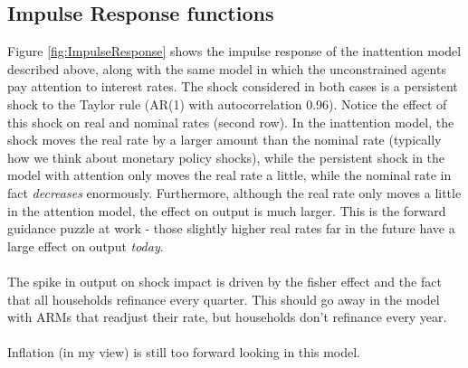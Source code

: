 \documentclass[AER]{AEA}
\begin{document}
\subsection{Impulse Response functions}
Figure \ref{fig:ImpulseResponse} shows the impulse response of the inattention model described above, along with the same model in which the unconstrained agents pay attention to interest rates. The shock considered in both cases is a persistent shock to the Taylor rule (AR(1) with autocorrelation 0.96). Notice the effect of this shock on real and nominal rates (second row). In the inattention model, the shock moves the real rate by a larger amount than the nominal rate (typically how we think about monetary policy shocks), while the persistent shock in the model with attention only moves the real rate a little, while the nominal rate in fact \textit{decreases} enormously. Furthermore, although the real rate only moves a little in the attention model, the effect on output is much larger. This is the forward guidance puzzle at work - those slightly higher real rates far in the future have a large effect on output \textit{today}.\\
\\
The spike in output on shock impact is driven by the fisher effect and the fact that all households refinance every quarter. This should go away in the model with ARMs that readjust their rate, but households don't refinance every year.\\
\\
Inflation (in my view) is still too forward looking in this model.
\end{document}
